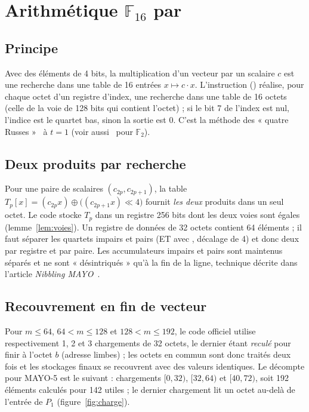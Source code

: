 \section{Arithmétique $\mathbb{F}_{16}$ par \vpshufb}
\subsection{Principe}
Avec des éléments de 4 bits, la multiplication d'un vecteur par un scalaire $c$ est une recherche dans une table de 16 entrées $x\mapsto c\cdot x$. L'instruction \vpshufb{} () réalise, pour chaque octet d'un registre d'index, une recherche dans une table de 16 octets (celle de la voie de 128 bits qui contient l'octet) ; si le bit 7 de l'index est nul, l'indice est le quartet bas, sinon la sortie est 0. C'est la méthode des « quatre Russes »~\cite{russes} à $t=1$ (voir aussi~\cite{albrecht2011} pour $\mathbb{F}_2$).

\subsection{Deux produits par recherche}
Pour une paire de scalaires $(c_{2p},c_{2p+1})$, la table $T_p[x]=(c_{2p}x)\oplus\big((c_{2p+1}x)\ll4\big)$ fournit \emph{les deux} produits dans un seul octet. Le code stocke $T_p$ dans un registre 256 bits dont les deux voies sont égales (lemme~\ref{lem:voies}). Un registre de données de 32 octets contient 64 éléments ; il faut séparer les quartets impairs et pairs (ET avec , décalage de 4) et donc deux \vpshufb{} par registre et par paire. Les accumulateurs impairs et pairs sont maintenus séparés et ne sont « désintriqués » qu'à la fin de la ligne, technique décrite dans l'article \emph{Nibbling MAYO}~\cite{nibbling}.

\subsection{Recouvrement en fin de vecteur}
Pour $m\le64$, $64<m\le128$ et $128<m\le192$, le code officiel utilise respectivement 1, 2 et 3 chargements de 32 octets, le dernier étant \emph{reculé} pour finir à l'octet $b$ (adresse  limbes) ; les octets en commun sont donc traités deux fois et les stockages finaux se recouvrent avec des valeurs identiques. Le décompte pour MAYO-5 est le suivant : chargements $[0,32)$, $[32,64)$ et $[40,72)$, soit 192 éléments calculés pour 142 utiles ; le dernier chargement lit un octet au-delà de l'entrée de $P_1$ (figure~\ref{fig:charge}).


